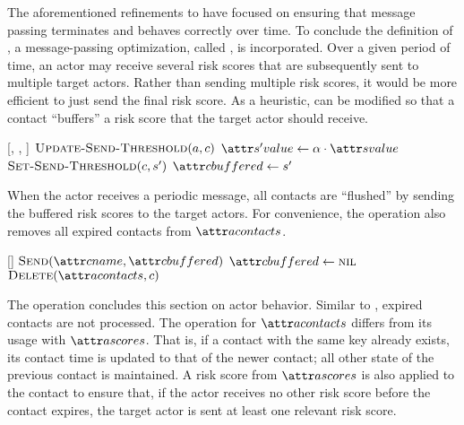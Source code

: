 The aforementioned refinements to \cApplyRiskScore have focused on ensuring that message passing terminates and behaves correctly over time. To conclude the definition of \cApplyRiskScore, a message-passing optimization, called  \citep{McCune2015}, is incorporated. Over a given period of time, an actor may receive several risk scores that are subsequently sent to multiple target actors. Rather than sending multiple risk scores, it would be more efficient to just send the final risk score. As a heuristic, \cApplyRiskScore can be modified so that a contact ``buffers'' a risk score that the target actor should receive.

\begin{function}{\nApplyRiskScore}[\vActor, \vContact, \vScore]
  \State $\cUpdateSendThreshold[\vActor, \vContact]$
  \If{$\aContactThresholdValue < \aScoreValue \AND \aContactTime + \pTimeBuffer > \aScoreTime$}
    \State $\aNewScoreValue \assign \pTransmissionRate \cdot \aScoreValue$
    \State $\cSetSendThreshold[\vContact, \vNewScore]$
    \State $\aContactBuffered \assign \vNewScore$
  \EndIf
\end{function}

When the actor receives a periodic  message, all contacts are ``flushed'' by sending the buffered risk scores to the target actors. For convenience, the \cHandleFlushTimeout operation also removes all expired contacts from $\aActorContacts$. 

\begin{function}[H]{\nHandleFlushTimeout}[\vActor]
  \ForEach{$\vContact \in \aActorContacts$}
    \If{$\aContactBuffered \notEquals \nil$}
      \State $\cSend[\aContactName, \aContactBuffered]$
      \State $\aContactBuffered \assign \nil$
    \EndIf
      \State $\cDelete[\aActorContacts, \vContact]$
    \EndIf
  \EndFor
\end{function}

The \cHandleContact operation concludes this section on actor behavior. Similar to \cHandleRiskScore, expired contacts are not processed. The \cMerge operation for $\aActorContacts$ differs from its usage with $\aActorScores$. That is, if a contact with the same key already exists, its contact time is updated to that of the newer contact; all other state of the previous contact is maintained. A risk score from $\aActorScores$ is also applied to the contact to ensure that, if the actor receives no other risk score before the contact expires, the target actor is sent at least one relevant risk score.

